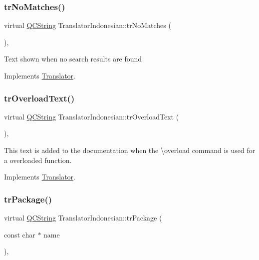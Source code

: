 \subsubsection{\texorpdfstring{trNoMatches()}{trNoMatches()}}
{\footnotesize\ttfamily virtual \mbox{\hyperlink{class_q_c_string}{Q\+C\+String}} Translator\+Indonesian\+::tr\+No\+Matches (\begin{DoxyParamCaption}{ }\end{DoxyParamCaption})\hspace{0.3cm}{\ttfamily [inline]}, {\ttfamily [virtual]}}

Text shown when no search results are found 

Implements \mbox{\hyperlink{class_translator}{Translator}}.

\mbox{\label{class_translator_indonesian_a8ac8bb07a59c063c22fcffa4c04db017}} 
\subsubsection{\texorpdfstring{trOverloadText()}{trOverloadText()}}
{\footnotesize\ttfamily virtual \mbox{\hyperlink{class_q_c_string}{Q\+C\+String}} Translator\+Indonesian\+::tr\+Overload\+Text (\begin{DoxyParamCaption}{ }\end{DoxyParamCaption})\hspace{0.3cm}{\ttfamily [inline]}, {\ttfamily [virtual]}}

This text is added to the documentation when the \textbackslash{}overload command is used for a overloaded function. 

Implements \mbox{\hyperlink{class_translator}{Translator}}.

\mbox{\label{class_translator_indonesian_af1065faaa13342441f5db63b071fa3e7}} 
\subsubsection{\texorpdfstring{trPackage()}{trPackage()}}
{\footnotesize\ttfamily virtual \mbox{\hyperlink{class_q_c_string}{Q\+C\+String}} Translator\+Indonesian\+::tr\+Package (\begin{DoxyParamCaption}\item[{const char $\ast$}]{name }\end{DoxyParamCaption})\hspace{0.3cm}{\ttfamily [inline]}, {\ttfamily [virtual]}}

